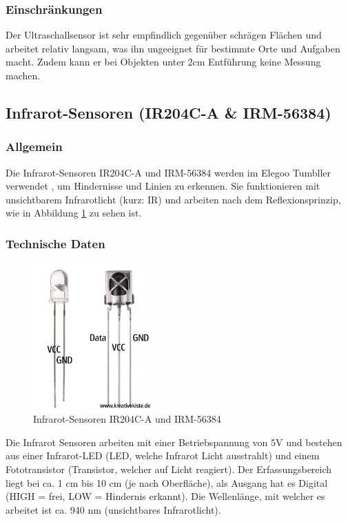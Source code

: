 \subsubsection{Einschränkungen}
Der Ultraschallsensor ist sehr empfindlich
gegenüber schrägen Flächen und arbeitet relativ langsam,
was ihn ungeeignet für bestimmte Orte und Aufgaben macht.
%
Zudem kann er bei Objekten unter 2cm Entführung keine Messung machen.
%
\subsection{Infrarot-Sensoren (IR204C-A \& IRM-56384)}
%
\subsubsection{Allgemein}
Die Infrarot-Sensoren IR204C-A und IRM-56384 werden im Elegoo Tumbller verwendet \cite{ir-sensor},
um Hindernisse und Linien zu erkennen.
%
Sie funktionieren mit unsichtbarem Infrarotlicht (kurz: IR)
und arbeiten nach dem Reflexionsprinzip,
wie in Abbildung \ref{fig:infrarot_sensoren} zu sehen ist.
\subsubsection{Technische Daten}
\begin{figure}[H]
    \centering
    \includegraphics[width=0.4\textwidth]{img/Hardware/Infrarot_Sensor.png}
    \caption{Infrarot-Sensoren IR204C-A und IRM-56384}
    \label{fig:infrarot_sensoren}
\end{figure}
Die Infrarot Sensoren arbeiten mit einer Betriebspannung von 5V und bestehen aus einer Infrarot-LED
(LED, welche Infrarot Licht ausstrahlt) und 
einem Fototransistor (Transistor, welcher auf Licht reagiert).
%
Der Erfassungsbereich liegt bei ca. 1 cm bis 10 cm (je nach Oberfläche),
als Ausgang hat es Digital (HIGH = frei, LOW = Hindernis erkannt).
%
Die Wellenlänge, mit welcher es arbeitet ist ca. 940 nm (unsichtbares Infrarotlicht).

